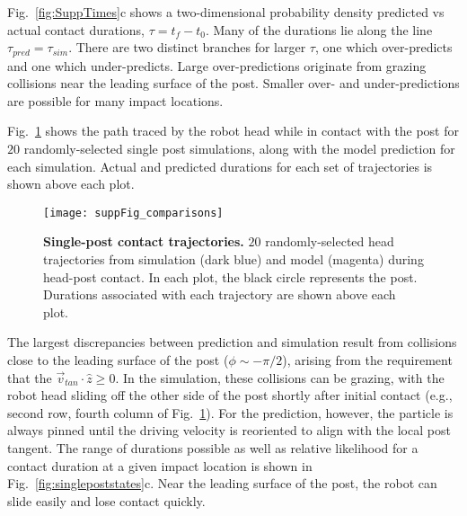 \documentclass[aps,pre,twocolumn,superscriptaddress]{revtex4-1}
\begin{document}
Fig.~\ref{fig:SuppTimes}c shows a two-dimensional probability density predicted vs actual contact durations, $\tau = t_f - t_0$. Many of the durations lie along the line $\tau_{pred} = \tau_{sim}$. There are two distinct branches for larger $\tau$, one which over-predicts and one which under-predicts.  Large over-predictions originate from grazing collisions near the leading surface of the post. Smaller over- and under-predictions are possible for many impact locations.

Fig.~\ref{fig:comparisons} shows the path traced by the robot head while in contact with the post for $20$ randomly-selected single post simulations, along with the model prediction for each simulation. Actual and predicted durations for each set of trajectories is shown above each plot.  
\begin{figure}[h!]
	\texttt{[image: suppFig\_comparisons]}
	\caption{\textbf{Single-post contact trajectories.} $20$ randomly-selected  head trajectories from simulation (dark blue) and  model (magenta) during head-post contact. In each plot, the black circle represents the post. Durations associated with each trajectory are shown above each plot.}
	\label{fig:comparisons}
\end{figure}

The largest discrepancies between prediction and simulation result from collisions close to the leading surface of the post ($\phi \sim -\pi/2$), arising from the requirement that the $\vec{v}_{tan} \cdot \hat{z} \geq 0$. In the simulation, these collisions can be grazing, with the robot head sliding off the other side of the post shortly after initial contact (e.g., second row, fourth column of Fig.~\ref{fig:comparisons}). For the prediction, however, the particle is always pinned until the driving velocity is reoriented to align with the local post tangent. The range of durations possible as well as relative likelihood for a contact duration at a given impact location is shown in Fig.~\ref{fig:singlepoststates}c. Near the leading surface of the post, the robot can slide easily and lose contact quickly. 
\end{document}
